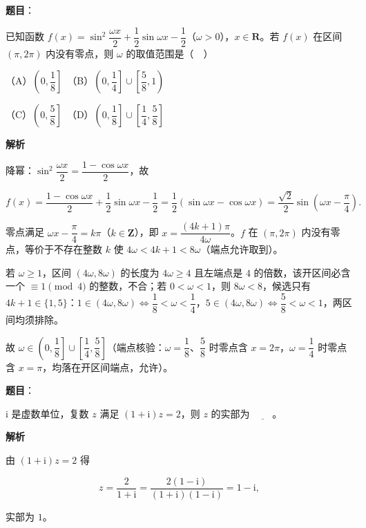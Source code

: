 \begin{answer}

\textbf{题目}：

已知函数 \(f(x)=\sin^{2}\dfrac{\omega x}{2}+\dfrac{1}{2}\sin\omega x-\dfrac{1}{2}\)（\(\omega>0\)），\(x\in\mathbf{R}\)。若 \(f(x)\) 在区间 \((\pi,2\pi)\) 内没有零点，则 \(\omega\) 的取值范围是（　）

（A）\(\left(0,\dfrac{1}{8}\right]\)　（B）\(\left(0,\dfrac{1}{4}\right]\cup\left[\dfrac{5}{8},1\right)\)

（C）\(\left(0,\dfrac{5}{8}\right]\)　（D）\(\left(0,\dfrac{1}{8}\right]\cup\left[\dfrac{1}{4},\dfrac{5}{8}\right]\)

\textbf{解析}

降幂：\(\sin^{2}\dfrac{\omega x}{2}=\dfrac{1-\cos\omega x}{2}\)，故

\nopagebreak[4]
\[
f(x)=\dfrac{1-\cos\omega x}{2}+\dfrac{1}{2}\sin\omega x-\dfrac{1}{2}=\dfrac{1}{2}\left(\sin\omega x-\cos\omega x\right)=\dfrac{\sqrt{2}}{2}\sin\left(\omega x-\dfrac{\pi}{4}\right).
\]

零点满足 \(\omega x-\dfrac{\pi}{4}=k\pi\)（\(k\in\mathbf{Z}\)），即 \(x=\dfrac{(4k+1)\pi}{4\omega}\)。\(f\) 在 \((\pi,2\pi)\) 内没有零点，等价于不存在整数 \(k\) 使 \(4\omega<4k+1<8\omega\)（端点允许取到）。

若 \(\omega\geqslant 1\)，区间 \((4\omega,8\omega)\) 的长度为 \(4\omega\geqslant 4\) 且左端点是 \(4\) 的倍数，该开区间必含一个 \(\equiv 1\pmod 4\) 的整数，不合；若 \(0<\omega<1\)，则 \(8\omega<8\)，候选只有 \(4k+1\in\{1,5\}\)：\(1\in(4\omega,8\omega)\iff\dfrac{1}{8}<\omega<\dfrac{1}{4}\)，\(5\in(4\omega,8\omega)\iff\dfrac{5}{8}<\omega<1\)，两区间均须排除。

故 \(\omega\in\left(0,\dfrac{1}{8}\right]\cup\left[\dfrac{1}{4},\dfrac{5}{8}\right]\)（端点核验：\(\omega=\dfrac{1}{8}\)、\(\dfrac{5}{8}\) 时零点含 \(x=2\pi\)，\(\omega=\dfrac{1}{4}\) 时零点含 \(x=\pi\)，均落在开区间端点，允许）。

\gkanswer{答案：D，\(\left(0,\dfrac{1}{8}\right]\cup\left[\dfrac{1}{4},\dfrac{5}{8}\right]\)}

\end{answer}
\begin{answer}

\textbf{题目}：

\(\mathrm{i}\) 是虚数单位，复数 \(z\) 满足 \((1+\mathrm{i})z=2\)，则 \(z\) 的实部为 \(\underline{\qquad}\)。

\textbf{解析}

由 \((1+\mathrm{i})z=2\) 得

\nopagebreak[4]
\[
z=\dfrac{2}{1+\mathrm{i}}=\dfrac{2(1-\mathrm{i})}{(1+\mathrm{i})(1-\mathrm{i})}=1-\mathrm{i},
\]

实部为 \(1\)。


\end{answer}
